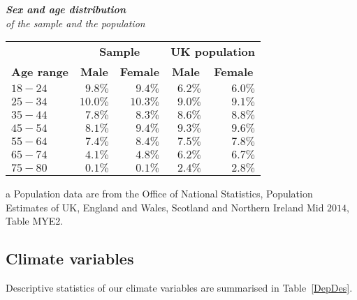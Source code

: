 \documentclass[a4paper,12pt]{article}
\begin{document}
{\centering
\begin{threeparttable}
\caption{\textit{\textbf{Sex and age distribution} \\ of the sample and the population}}
\label{SexAge} 
\begin{small}
\begin{tabular}{|l|rr|rr|} 
\hline	
  \multicolumn{1}{|l|}{ } & \multicolumn{2}{c}{\bf{Sample}} & \multicolumn{2}{|c|}{\bf{UK population\tnote{a}}} \\ %
    \multicolumn{1}{|l|}{\vspace{0.1cm}\textbf{Age range}}  &  \multicolumn{1}{|c}{\bf{Male}} & \multicolumn{1}{c}{\bf{Female}} & \multicolumn{1}{|c}{\bf{Male}} & \multicolumn{1}{c|}{\bf{Female}}\\ 
\hline 
$18-24$&$9.8\%$&$9.4\%$&$6.2\%$&$6.0\%$\\
$25-34$&$10.0\%$&$10.3\%$&$9.0\%$&$9.1\%$\\
$35-44$&$7.8\%$&$8.3\%$&$8.6\%$&$8.8\%$\\
$45-54$&$8.1\%$&$9.4\%$&$9.3\%$&$9.6\%$\\
$55-64$&$7.4\%$&$8.4\%$&$7.5\%$&$7.8\%$\\
$65-74$&$4.1\%$&$4.8\%$&$6.2\%$&$6.7\%$\\
$75-80$&$0.1\%$&$0.1\%$&$2.4\%$&$2.8\%$\\
\hline
\hline
\end{tabular} 
  \begin{tablenotes}
  \begin{footnotesize}
  \singlespacing
     \item[a]Population data are from the Office of National Statistics, Population Estimates of UK, England and
Wales, Scotland and Northern Ireland Mid $2014$, Table MYE2.
\singlespacing
  \end{footnotesize}
\end{tablenotes}
\end{small}
  \end{threeparttable} \par}


\hspace{1.5cm}




\subsection{Climate variables}\label{ClimateVars}


Descriptive statistics of our climate variables are summarised in Table~\ref{DepDes}.
\end{document}
